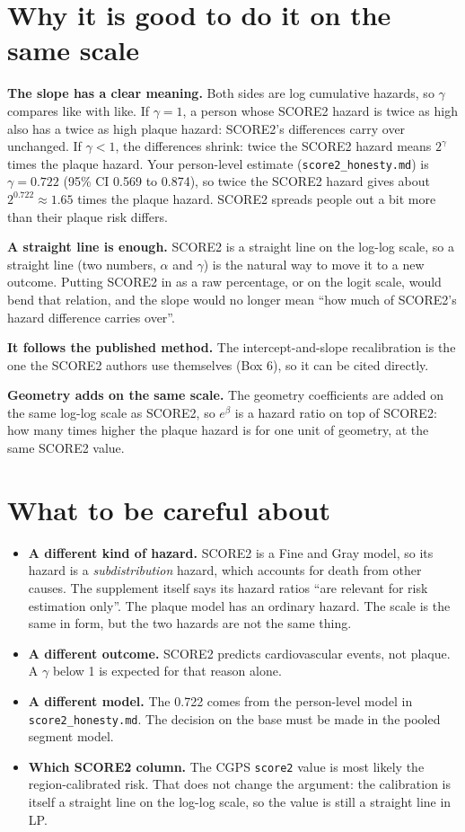 \documentclass[11pt]{article}
\begin{document}
\section{Why it is good to do it on the same scale}

\textbf{The slope has a clear meaning.} Both sides are log cumulative hazards, so $\gamma$
compares like with like.
If $\gamma = 1$, a person whose SCORE2 hazard is twice as high also has a twice as high plaque
hazard: SCORE2's differences carry over unchanged.
If $\gamma < 1$, the differences shrink: twice the SCORE2 hazard means $2^{\gamma}$ times the
plaque hazard. Your person-level estimate (\texttt{score2\_honesty.md}) is $\gamma = 0.722$
(95\% CI 0.569 to 0.874), so twice the SCORE2 hazard gives about $2^{0.722} \approx 1.65$ times
the plaque hazard. SCORE2 spreads people out a bit more than their plaque risk differs.

\textbf{A straight line is enough.} SCORE2 is a straight line on the log-log scale, so a
straight line (two numbers, $\alpha$ and $\gamma$) is the natural way to move it to a new
outcome. Putting SCORE2 in as a raw percentage, or on the logit scale, would bend that
relation, and the slope would no longer mean ``how much of SCORE2's hazard difference carries
over''.

\textbf{It follows the published method.} The intercept-and-slope recalibration is the one the
SCORE2 authors use themselves (Box 6), so it can be cited directly.

\textbf{Geometry adds on the same scale.} The geometry coefficients are added on the same
log-log scale as SCORE2, so $e^{\beta}$ is a hazard ratio on top of SCORE2: how many times
higher the plaque hazard is for one unit of geometry, at the same SCORE2 value.

\section{What to be careful about}

\begin{itemize}
\item \textbf{A different kind of hazard.} SCORE2 is a Fine and Gray model, so its hazard is a
  \emph{subdistribution} hazard, which accounts for death from other causes. The supplement
  itself says its hazard ratios ``are relevant for risk estimation only''. The plaque model has
  an ordinary hazard. The scale is the same in form, but the two hazards are not the same thing.
\item \textbf{A different outcome.} SCORE2 predicts cardiovascular events, not plaque. A
  $\gamma$ below 1 is expected for that reason alone.
\item \textbf{A different model.} The 0.722 comes from the person-level model in
  \texttt{score2\_honesty.md}. The decision on the base must be made in the pooled segment
  model.
\item \textbf{Which SCORE2 column.} The CGPS \texttt{score2} value is most likely the
  region-calibrated risk. That does not change the argument: the calibration is itself a
  straight line on the log-log scale, so the value is still a straight line in LP.
\end{itemize}
\end{document}
